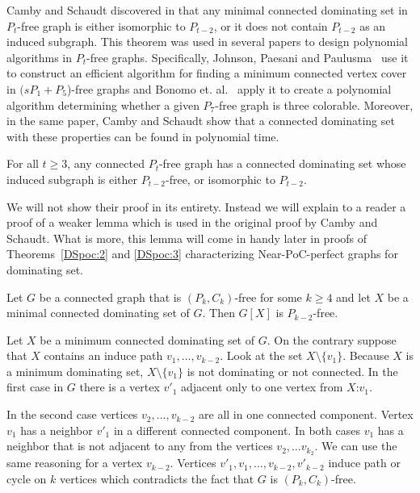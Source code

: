 Camby and Schaudt discovered in \cite{CambySchaudt16} that any minimal connected dominating set in \(P_t\)-free graph
is either isomorphic to \(P_{t-2}\), or it does not contain \(P_{t-2}\) as an induced subgraph.
This theorem was used in several papers to design polynomial algorithms in \(P_t\)-free graphs.
Specifically, Johnson, Paesani and Paulusma~\cite{JohnsonPaesaniPaulusma20} use it to construct an efficient algorithm for finding a minimum connected vertex cover in \((sP_1 + P_5\))-free graphs
and Bonomo et. al.~\cite{Bonomo18} apply it to create a polynomial algorithm determining whether a given \(P_7\)-free graph is three colorable.
Moreover, in the same paper, Camby and Schaudt show that a connected dominating set with these properties can be found in polynomial time.

\begin{thm}\label{DS:P-2freeT}
	For all \(t \geq 3\), any connected \(P_t\)-free graph has a connected dominating set whose induced subgraph is either \(P_{t-2}\)-free, 
	or isomorphic to \(P_{t-2}\).
\end{thm}

We will not show their proof in its entirety. 
Instead we will explain to a reader a proof of a weaker lemma which is used in the original proof by Camby and Schaudt.
What is more, this lemma will come in handy later in proofs of Theorems~\ref{DSpoc:2} and \ref{DSpoc:3} characterizing Near-PoC-perfect graphs for dominating set.
\begin{lemma}\label{DS:P-2free}
Let \(G\) be a connected graph that is \((P_k , C_k )\)-free for some \(k \geq 4\) and
let \(X\) be a minimal connected dominating set of \(G\). Then \(G[X]\) is \(P_{k-2}\)-free.
\end{lemma}
\begin{myproof}
	Let \(X\) be a minimum connected dominating set of \(G\).
	On the contrary suppose that \(X\) contains an induce path \(v_1, \dots, v_{k-2}\).
	Look at the set \(X \setminus \{v_1\}\).
	Because \(X\) is a minimum dominating set, \(X \setminus \{v_1\}\) is not dominating or not connected.
	In the first case in \(G\) there is a vertex \(v'_1\) adjacent only to one vertex from \(X\):\(v_1\).
	
	In the second case vertices \(v_2, \dots, v_{k-2}\) are all in one connected component. 
	Vertex \(v_1\) has a neighbor \(v'_1\) in a different connected component.
	In both cases \(v_1\) has a neighbor that is not adjacent to any from the vertices \(v_2, \dots v_{k_2}\).
	We can use the same reasoning for a vertex \(v_{k-2}\).
	Vertices \(v'_1, v_1, \dots, v_{k-2}, v'_{k-2}\) induce path or cycle on \(k\) vertices which contradicts
	the fact that \(G\) is \((P_k, C_k)\)-free.
\end{myproof}

